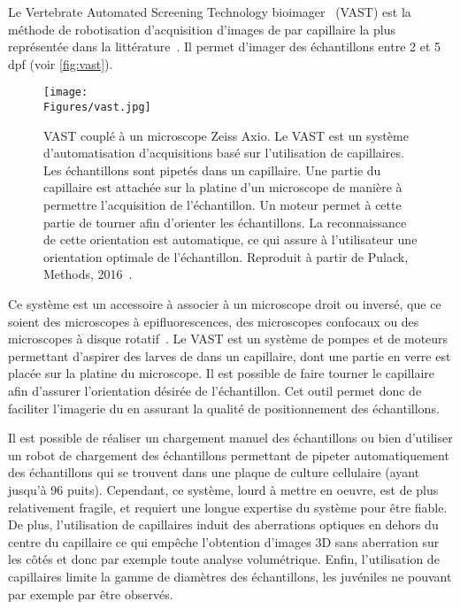 \documentclass[\main/main.tex]{subfiles}
\begin{document}
\label{sec:vast}
Le Vertebrate Automated Screening Technology bioimager~\cite{pardomartin_2010} (VAST) est la méthode de robotisation d'acquisition d'images de \pz{} par capillaire la plus représentée dans la littérature~\cite{jarque_2018,teixid_2019}. Il permet d'imager des échantillons entre 2 et 5 dpf (voir \autoref{fig:vast}).

\begin{figure}[h!]{\textwidth} 
    \centering
       \centering \texttt{[image: \\Figures/vast.jpg]}
       \caption{
            \label{fig:vast}
            VAST couplé à un microscope Zeiss Axio.
            \newline
            Le VAST est un système d'automatisation d'acquisitions basé sur l'utilisation de capillaires.
            Les échantillons sont pipetés dans un capillaire.
            Une partie du capillaire est attachée sur la platine d'un microscope de manière à permettre l'acquisition de l'échantillon.
            Un moteur permet à cette partie de tourner afin d'orienter les échantillons.
            La reconnaissance de cette orientation est automatique, ce qui assure à l'utilisateur une orientation optimale de l'échantillon.
            \newline
            Reproduit à partir de Pulack, Methods, 2016~\cite{pulak_2016}.
            }
\end{figure}

%
Ce système est un accessoire à associer à un microscope droit ou inversé, que ce soient des microscopes à epifluorescences, des microscopes confocaux ou des microscopes à disque rotatif~\cite{early_2018, guo_2017}.
%
Le VAST est un système de pompes et de moteurs permettant d'aspirer des larves de \pz{} dans un capillaire, dont une partie en verre est placée sur la platine du microscope. 
%
Il est possible de faire tourner le capillaire afin d'assurer l'orientation désirée de l'échantillon.
%
Cet outil permet donc de faciliter l'imagerie du \pz{} en assurant la qualité de positionnement des échantillons.

%
Il est possible de réaliser un chargement manuel des échantillons ou bien d'utiliser un robot de chargement des échantillons permettant de pipeter automatiquement des échantillons qui se trouvent dans une plaque de culture cellulaire (ayant jusqu'à 96 puits).
%
Cependant, ce système, lourd à mettre en oeuvre, est de plus relativement fragile, et requiert une longue expertise du système pour être fiable.
De plus, l'utilisation de capillaires induit des aberrations optiques en dehors du centre du capillaire ce qui empêche l'obtention d'images 3D sans aberration sur les côtés et donc par exemple toute analyse volumétrique. Enfin, l'utilisation de capillaires limite la gamme de diamètres des échantillons, les juvéniles ne pouvant par exemple par être observés.
\end{document}
